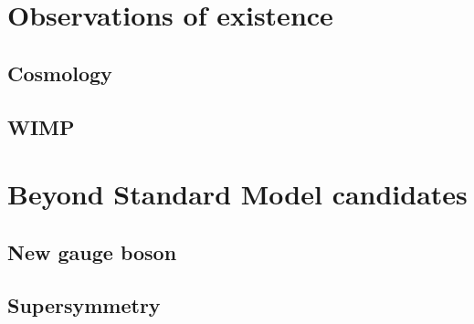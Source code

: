 \documentclass[14pt, a4paper]{book}
\begin{document}
\section{Observations of existence}
\subsection{Cosmology}
\subsection{WIMP}

\section{Beyond Standard Model candidates}
\subsection{New gauge boson}
\subsection{Supersymmetry}
\end{document}
